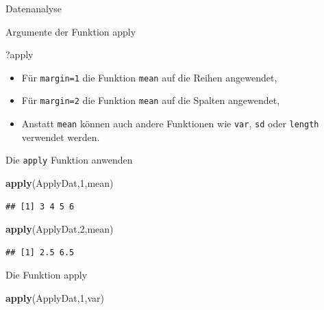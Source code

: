\documentclass[ignorenonframetext,]{beamer}
\newenvironment{Shaded}{}{}
\newcommand{\KeywordTok}[1]{\textcolor[rgb]{0.00,0.44,0.13}{\textbf{{#1}}}}
\newcommand{\DecValTok}[1]{\textcolor[rgb]{0.25,0.63,0.44}{{#1}}}
\newcommand{\NormalTok}[1]{{#1}}
\begin{document}
\begin{frame}[fragile]{Datenanalyse}
\begin{block}{Argumente der Funktion apply}

\begin{Shaded}
\begin{Highlighting}[]
\NormalTok{?apply}
\end{Highlighting}
\end{Shaded}

\begin{itemize}
\item
  Für \texttt{margin=1} die Funktion \texttt{mean} auf die Reihen
  angewendet,
\item
  Für \texttt{margin=2} die Funktion \texttt{mean} auf die Spalten
  angewendet,
\item
  Anstatt \texttt{mean} können auch andere Funktionen wie \texttt{var},
  \texttt{sd} oder \texttt{length} verwendet werden.
\end{itemize}

\end{block}

\begin{block}{Die \texttt{apply} Funktion anwenden}

\begin{Shaded}
\begin{Highlighting}[]
\KeywordTok{apply}\NormalTok{(ApplyDat,}\DecValTok{1}\NormalTok{,mean)}
\end{Highlighting}
\end{Shaded}

\begin{verbatim}
## [1] 3 4 5 6
\end{verbatim}

\begin{Shaded}
\begin{Highlighting}[]
\KeywordTok{apply}\NormalTok{(ApplyDat,}\DecValTok{2}\NormalTok{,mean)}
\end{Highlighting}
\end{Shaded}

\begin{verbatim}
## [1] 2.5 6.5
\end{verbatim}

\end{block}

\begin{block}{Die Funktion apply}

\begin{Shaded}
\begin{Highlighting}[]
\KeywordTok{apply}\NormalTok{(ApplyDat,}\DecValTok{1}\NormalTok{,var)}
\end{Highlighting}
\end{Shaded}


\end{block}
\end{frame}
\end{document}
